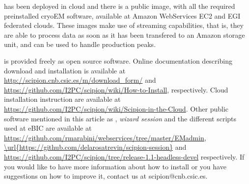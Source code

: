  \scipion has been deployed in cloud and there is a public image, with all the required preinstalled cryoEM software,  available at Amazon WebServices EC2 and EGI federated clouds. These images make use of \scipion streaming capabilities, that is, they are able to process data as soon as it has been transfered to an Amazon storage unit, and can be used to handle  production peaks.
 
 
\scipion is provided 
freely as open source software. Online documentation
describing \scipion download and installation is available
at \url{http://scipion.cnb.csic.es/m/download_form/} and \url{https://github.com/I2PC/scipion/wiki/How-to-Install}, respectively. Cloud installation instruction are available at \url{https://github.com/I2PC/scipion/wiki/Scipion-in-the-Cloud}. Other public software mentioned in this article as \emadmin, \emph{wizard session} and the different scripts used at eBIC are available at \url{https://github.com/rmarabini/webservices/tree/master/EMadmin}, \url{\url{https://github.com/delarosatrevin/scipion-session}} and \url{https://github.com/I2PC/scipion/tree/release-1.1-headless-devel} respectively.
If you would like to have more information about how to install \scipion or you have suggestions on how to improve it, contact us at scipion@cnb.csic.es.






